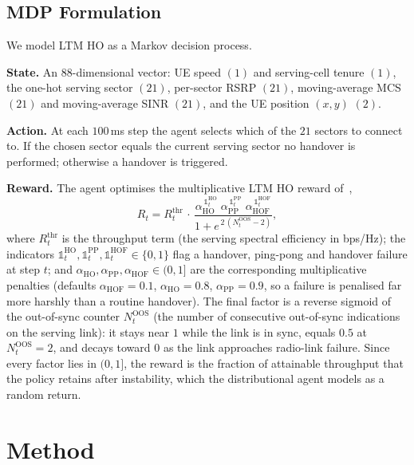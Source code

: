 \documentclass[conference]{IEEEtran}
\begin{document}
\subsection{MDP Formulation}
\label{sec:mdp}
We model LTM HO as a Markov decision process.

\textbf{State.} An $88$-dimensional vector: UE speed $(1)$ and serving-cell
tenure $(1)$, the one-hot serving sector $(21)$, per-sector RSRP $(21)$,
moving-average MCS $(21)$ and moving-average SINR $(21)$, and the UE position
$(x,y)$ $(2)$.

\textbf{Action.} At each $100$\,ms step the agent selects which of the $21$
sectors to connect to. If the chosen sector equals the current serving sector
no handover is performed; otherwise a handover is triggered.

\textbf{Reward.} The agent optimises the multiplicative LTM HO reward
of~\cite{cmab_ho},
\begin{equation}
R_t = R^{\mathrm{thr}}_t \,\cdot\,
      \frac{\alpha_{\mathrm{HO}}^{\,\mathbb{1}^{\mathrm{HO}}_t}\;
            \alpha_{\mathrm{PP}}^{\,\mathbb{1}^{\mathrm{PP}}_t}\;
            \alpha_{\mathrm{HOF}}^{\,\mathbb{1}^{\mathrm{HOF}}_t}}
           {1 + e^{\,2\,(N^{\mathrm{OOS}}_t - 2)}},
\label{eq:reward}
\end{equation}
where $R^{\mathrm{thr}}_t$ is the throughput term (the serving spectral
efficiency in bps/Hz); the indicators
$\mathbb{1}^{\mathrm{HO}}_t,\mathbb{1}^{\mathrm{PP}}_t,\mathbb{1}^{\mathrm{HOF}}_t\in\{0,1\}$
flag a handover, ping-pong and handover failure at step $t$; and
$\alpha_{\mathrm{HO}},\alpha_{\mathrm{PP}},\alpha_{\mathrm{HOF}}\in(0,1]$ are
the corresponding multiplicative penalties (defaults $\alpha_{\mathrm{HOF}}{=}0.1$,
$\alpha_{\mathrm{HO}}{=}0.8$, $\alpha_{\mathrm{PP}}{=}0.9$, so a failure is
penalised far more harshly than a routine handover). The final factor is a
reverse sigmoid of the out-of-sync counter $N^{\mathrm{OOS}}_t$ (the number of
consecutive out-of-sync indications on the serving link): it stays near $1$
while the link is in sync, equals $0.5$ at $N^{\mathrm{OOS}}_t{=}2$, and decays
toward $0$ as the link approaches radio-link failure. Since
every factor lies in $(0,1]$, the reward is the fraction of attainable
throughput that the policy retains after instability, which the distributional
agent models as a random return.

\section{Method}
\label{sec:method}
\end{document}
